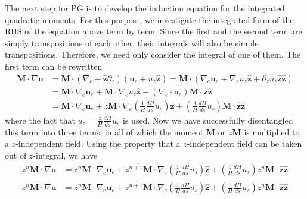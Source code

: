 The next step for PG is to develop the induction equation for the integrated quadratic moments. For this purpose, we investigate the integrated form of the RHS of the equation above term by term. Since the first and the second term are simply transpositions of each other, their integrals will also be simple transpositions. Therefore, we need only consider the integral of one of them. The first term can be rewritten
\begin{equation}\begin{aligned}
    \mathbf{M}\cdot \nabla \mathbf{u} &= \mathbf{M}\cdot (\nabla_e + \hat{\mathbf{z}}\partial_z)(\mathbf{u}_e + u_z \hat{\mathbf{z}}) = \mathbf{M}\cdot (\nabla_e \mathbf{u}_e + \nabla_e u_z \hat{\mathbf{z}} + \partial_z u_z \hat{\mathbf{z}} \hat{\mathbf{z}}) \\ 
    &= \mathbf{M}\cdot \nabla_e \mathbf{u}_e + \mathbf{M}\cdot \nabla_e u_z \hat{\mathbf{z}} - (\nabla_e \cdot \mathbf{u}_e) \mathbf{M}\cdot \hat{\mathbf{z}} \hat{\mathbf{z}} \\ 
    &= \mathbf{M}\cdot \nabla_e \mathbf{u}_e + z\mathbf{M}\cdot \nabla_e \left(\frac{1}{H}\frac{dH}{ds}u_s\right) \hat{\mathbf{z}} + \left(\frac{1}{H}\frac{dH}{ds}u_s\right) \mathbf{M}\cdot \hat{\mathbf{z}} \hat{\mathbf{z}}
\end{aligned}\end{equation}
where the fact that $u_z = \frac{z}{H}\frac{dH}{ds}u_s$ is used. Now we have successfully disentangled this term into three terms, in all of which the moment $\mathbf{M}$ or $z\mathbf{M}$ is multiplied to a $z$-independent field.
Using the property that a $z$-independent field can be taken out of $z$-integral, we have
\begin{equation}\label{eqn:induction-int-tensor-term1}
\begin{aligned}
    \overline{z^n \mathbf{M}\cdot \nabla\mathbf{u}} &= \overline{z^n \mathbf{M}}\cdot \nabla_e \mathbf{u}_e + \overline{z^{n+1} \mathbf{M}}\cdot \nabla_e \left(\frac{1}{H}\frac{dH}{ds}u_s\right) \hat{\mathbf{z}} + \left(\frac{1}{H}\frac{dH}{ds}u_s\right) \overline{z^n \mathbf{M}}\cdot \hat{\mathbf{z}} \hat{\mathbf{z}} \\ 
    \widetilde{z^n \mathbf{M}\cdot \nabla\mathbf{u}} &= \widetilde{z^n \mathbf{M}}\cdot \nabla_e \mathbf{u}_e + \widetilde{z^{n+1}\mathbf{M}}\cdot \nabla_e \left(\frac{1}{H}\frac{dH}{ds}u_s\right) \hat{\mathbf{z}} + \left(\frac{1}{H}\frac{dH}{ds}u_s\right) \widetilde{z^n \mathbf{M}}\cdot \hat{\mathbf{z}} \hat{\mathbf{z}}
\end{aligned}
\end{equation}
